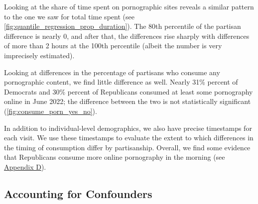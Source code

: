 \documentclass[12pt,twoside]{article}
\begin{document}
Looking at the share of time spent on pornographic sites reveals a similar pattern to the one we saw for total time spent (see \cref{fig:quantile_regression_prop_duration}). The 80th percentile of the partisan difference is nearly 0, and after that, the differences rise sharply with differences of more than 2 hours at the 100th percentile (albeit the number is very imprecisely estimated).

Looking at differences in the percentage of partisans who consume any pornographic content, we find little difference as well. Nearly 31\% percent of Democrats and 30\% percent of Republicans consumed at least some pornography online in June 2022; the difference between the two is not statistically significant (\cref{fig:consume_porn_yes_no}). 

In addition to individual-level demographics, we also have precise timestamps for each visit. We use these timestamps to evaluate the extent to which differences in the timing of consumption differ by partisanship. Overall, we find some evidence that Republicans consume more online pornography in the morning (see \hyperref[sm:smD]{Appendix D}).

\subsection{Accounting for Confounders}
\end{document}
